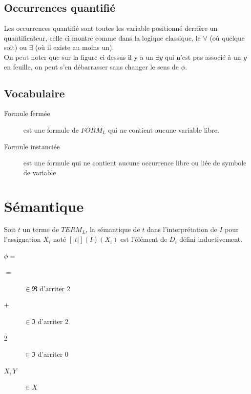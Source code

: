 \subsection{Occurrences quantifié}
Les occurrences quantifié sont toutes les variable positionné derrière un quantificateur, celle ci montre comme dans la logique classique, le $\forall$ (où quelque soit) ou $\exists$ (où il existe au moins un).\\
On peut noter que sur la figure ci dessus il y a un $\exists y$ qui n'est pas associé à un $y$ en feuille, on peut s'en débarrasser sans changer le sens de $\phi$.

\subsection{Vocabulaire}
\begin{description}
\item[Formule fermée] est une formule de $FORM_{L}$ qui ne contient aucune variable libre.
\item[Formule instanciée] est une formule qui ne contient aucune occurrence libre ou liée de symbole de variable
\end{description}

\pagebreak
\section{Sémantique}
Soit $t$ un terme de $TERM_L$, la sémantique de $t$ dans l'interprétation de $I$ pour l'assignation $X_i$ noté $[|t|](I)(X_i)$ est l'élément de $D_i$ défini inductivement.

$\phi = $\\

\begin{description}
\item[$=$] $\in \Re$ d'arriter 2
\item[$+$] $\in \Im$ d'arriter 2
\item[$2$] $\in \Im$ d'arriter 0
\item[$X,Y$] $\in X$
\end{description}

